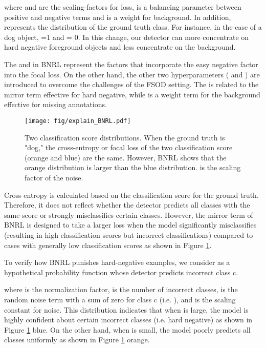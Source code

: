 \documentclass{article}
\begin{document}
where  and  are the scaling-factors for loss, 
 is a balancing parameter between positive and negative terms and  is a weight for background.
In addition,  represents the distribution of the ground truth class. For instance, in the case of a dog object,  =1 and  = 0.
In this change, our detector can more concentrate on hard negative foreground objects and less concentrate on the background.

The  and  in BNRL represent the factors that incorporate the easy negative factor into the focal loss. On the other hand, the other two hyperparameters ( and ) are introduced to overcome the challenges of the FSOD setting. The  is related to the mirror term effective for hard negative, while  is a weight term for the background effective for missing annotations.



\begin{figure}[h]
    \centering
    \texttt{[image: fig/explain\_BNRL.pdf]}
\caption{Two classification score distributions. When the ground truth is "dog," the cross-entropy or focal loss of the two classification score (orange and blue) are the same. However, BNRL shows that the orange distribution is larger than the blue distribution.  is the scaling factor of the noise.
}
\label{fig:BNRLvsCROSS}
\end{figure}

Cross-entropy is calculated based on the classification score for the ground truth. 
Therefore, it does not reflect whether the detector predicts all classes with the same score or strongly misclassifies certain classes.
However, the mirror term of BNRL is designed to take a larger loss when the model significantly misclassifies (resulting in high classification scores but incorrect classifications) compared to cases with generally low classification scores as shown in Figure \ref{fig:BNRLvsCROSS}.

To verify how BNRL punishes hard-negative examples, we consider  as a hypothetical probability function whose detector predicts incorrect class c.



where  is the normalization factor,  is the number of incorrect classes,  is the random noise term with a sum of zero for class c (i.e. ), and  is the scaling constant for noise.
This distribution indicates that when  is large, the model is highly confident about certain incorrect classes (i.e. hard negative) as shown in Figure \ref{fig:BNRLvsCROSS} blue. On the other hand, when  is small, the model poorly predicts all classes uniformly as shown in Figure \ref{fig:BNRLvsCROSS} orange.
\end{document}
